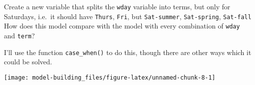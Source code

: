 \documentclass[]{book}
\newenvironment{Shaded}{\begin{snugshade}}{\end{snugshade}}
\newcommand{\DataTypeTok}[1]{\textcolor[rgb]{0.13,0.29,0.53}{#1}}
\newcommand{\FloatTok}[1]{\textcolor[rgb]{0.00,0.00,0.81}{#1}}
\newcommand{\KeywordTok}[1]{\textcolor[rgb]{0.13,0.29,0.53}{\textbf{#1}}}
\newcommand{\NormalTok}[1]{#1}
\newcommand{\OperatorTok}[1]{\textcolor[rgb]{0.81,0.36,0.00}{\textbf{#1}}}
\newcommand{\OtherTok}[1]{\textcolor[rgb]{0.56,0.35,0.01}{#1}}
\newcommand{\StringTok}[1]{\textcolor[rgb]{0.31,0.60,0.02}{#1}}
\theoremstyle{plain}
\theoremstyle{remark}
\begin{document}
Create a new variable that splits the \texttt{wday} variable into terms,
but only for Saturdays, i.e.~it should have \texttt{Thurs},
\texttt{Fri}, but \texttt{Sat-summer}, \texttt{Sat-spring},
\texttt{Sat-fall} How does this model compare with the model with every
combination of \texttt{wday} and \texttt{term}?

I'll use the function \texttt{case\_when()} to do this, though there are
other ways which it could be solved.

\begin{Shaded}
\end{Shaded}

\begin{Shaded}
\end{Shaded}

\begin{center}\texttt{[image: model-building\_files/figure-latex/unnamed-chunk-8-1]} \end{center}
\end{document}
